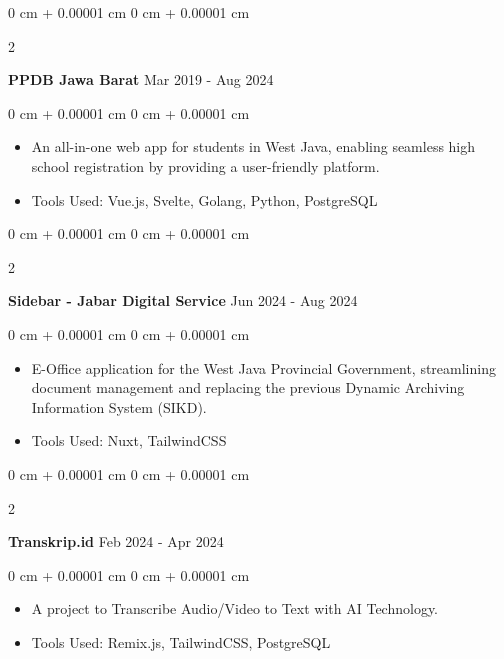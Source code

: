 \documentclass[10pt, letterpaper]{article}
\newenvironment{highlights}{
    \begin{itemize}[
        topsep=0.10 cm,
        parsep=0.10 cm,
        partopsep=0pt,
        itemsep=0pt,
        leftmargin=0 cm + 10pt
    ]
}{
    \end{itemize}
} %
\newenvironment{onecolentry}{
    \begin{adjustwidth}{
        0 cm + 0.00001 cm
    }{
        0 cm + 0.00001 cm
    }
}{
    \end{adjustwidth}
} %
\newenvironment{twocolentry}[2][]{
    \onecolentry
    \def\secondColumn{#2}
    \setcolumnwidth{\fill, 4.5 cm}
    \begin{paracol}{2}
}{
    \switchcolumn \raggedleft \secondColumn
    \end{paracol}
    \endonecolentry
} %
\begin{document}
        \vspace{0.2 cm}

        
        \begin{twocolentry}{
            Mar 2019 - Aug 2024
        }
            \textbf{PPDB Jawa Barat}\end{twocolentry}

        \vspace{0.10 cm}
        \begin{onecolentry}
            \begin{highlights}
                \item An all-in-one web app for students in West Java, enabling seamless high school registration by providing a user-friendly platform.
                \item Tools Used: Vue.js, Svelte, Golang, Python, PostgreSQL
            \end{highlights}
        \end{onecolentry}


        \vspace{0.2 cm}
        
        \begin{twocolentry}{
            Jun 2024 - Aug 2024
        }
            \textbf{Sidebar - Jabar Digital Service}\end{twocolentry}

        \vspace{0.10 cm}
        \begin{onecolentry}
            \begin{highlights}
                \item  E-Office application for the West Java Provincial Government, streamlining document management and replacing the previous Dynamic Archiving Information System (SIKD).
                \item Tools Used: Nuxt, TailwindCSS
            \end{highlights}
        \end{onecolentry}


        \vspace{0.2 cm}
        
        \begin{twocolentry}{
            Feb 2024 - Apr 2024
        }
            \textbf{Transkrip.id}\end{twocolentry}

        \vspace{0.10 cm}
        \begin{onecolentry}
            \begin{highlights}
                \item A project to Transcribe Audio/Video to Text with AI Technology.
                \item Tools Used: Remix.js, TailwindCSS, PostgreSQL
            \end{highlights}
        \end{onecolentry}
\end{document}
